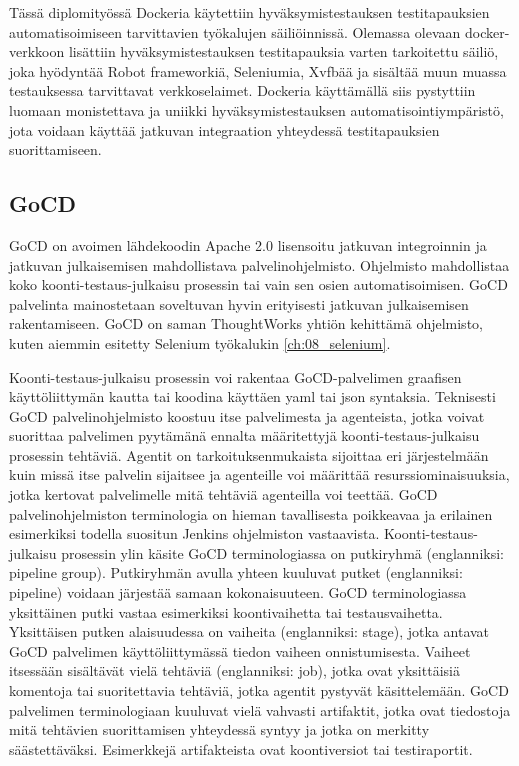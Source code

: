     Tässä diplomityössä Dockeria käytettiin hyväksymistestauksen testitapauksien automatisoimiseen tarvittavien työkalujen säiliöinnissä.
    Olemassa olevaan docker-verkkoon lisättiin hyväksymistestauksen testitapauksia varten tarkoitettu säiliö, joka hyödyntää Robot frameworkiä, Seleniumia, Xvfbää ja sisältää muun muassa testauksessa tarvittavat verkkoselaimet.
    Dockeria käyttämällä siis pystyttiin luomaan monistettava ja uniikki hyväksymistestauksen automatisointiympäristö, jota voidaan käyttää jatkuvan integraation yhteydessä testitapauksien suorittamiseen.

  \subsection{GoCD} \label{ch:08_gocd}

    GoCD on avoimen lähdekoodin Apache 2.0 lisensoitu jatkuvan integroinnin ja jatkuvan julkaisemisen mahdollistava palvelinohjelmisto.
    Ohjelmisto mahdollistaa koko koonti-testaus-julkaisu prosessin tai vain sen osien automatisoimisen.
    GoCD palvelinta mainostetaan soveltuvan hyvin erityisesti jatkuvan julkaisemisen rakentamiseen.
    GoCD on saman ThoughtWorks yhtiön kehittämä ohjelmisto, kuten aiemmin esitetty Selenium työkalukin \ref{ch:08_selenium}.

    Koonti-testaus-julkaisu prosessin voi rakentaa GoCD-palvelimen graafisen käyttöliittymän kautta tai koodina käyttäen yaml tai json syntaksia.
    Teknisesti GoCD palvelinohjelmisto koostuu itse palvelimesta ja agenteista, jotka voivat suorittaa palvelimen pyytämänä ennalta määritettyjä koonti-testaus-julkaisu prosessin tehtäviä.
    Agentit on tarkoituksenmukaista sijoittaa eri järjestelmään kuin missä itse palvelin sijaitsee ja agenteille voi määrittää resurssiominaisuuksia, jotka kertovat palvelimelle mitä tehtäviä agenteilla voi teettää.
    GoCD palvelinohjelmiston terminologia on hieman tavallisesta poikkeavaa ja erilainen esimerkiksi todella suositun Jenkins ohjelmiston vastaavista.
    Koonti-testaus-julkaisu prosessin ylin käsite GoCD terminologiassa on putkiryhmä (englanniksi: pipeline group).
    Putkiryhmän avulla yhteen kuuluvat putket (englanniksi: pipeline) voidaan järjestää samaan kokonaisuuteen.
    GoCD terminologiassa yksittäinen putki vastaa esimerkiksi koontivaihetta tai testausvaihetta.
    Yksittäisen putken alaisuudessa on vaiheita (englanniksi: stage), jotka antavat GoCD palvelimen käyttöliittymässä tiedon vaiheen onnistumisesta.
    Vaiheet itsessään sisältävät vielä tehtäviä (englanniksi: job), jotka ovat yksittäisiä komentoja tai suoritettavia tehtäviä, jotka agentit pystyvät käsittelemään.
    GoCD palvelimen terminologiaan kuuluvat vielä vahvasti artifaktit, jotka ovat tiedostoja mitä tehtävien suorittamisen yhteydessä syntyy ja jotka on merkitty säästettäväksi.
    Esimerkkejä artifakteista ovat koontiversiot tai testiraportit.

